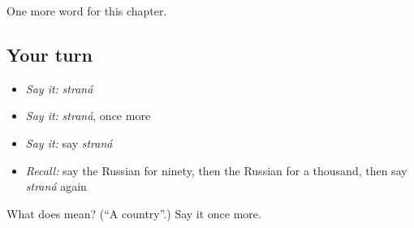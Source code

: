\begin{grammarlens}[title={What you've built}]
One more word for this chapter.
\end{grammarlens}

\subsection*{Your turn}
\begin{itemize}
\raggedright
  \item \emph{Say it:} \emph{straná}
  \item \emph{Say it:} \emph{straná}, once more
  \item \emph{Say it:} say \emph{straná}
  \item \emph{Recall:} say the Russian for ninety, then the Russian for a thousand, then say \emph{straná} again
\end{itemize}

\begin{tcolorbox}[breakable,colback=teal!4,colframe=teal!35!black,title={Before you move on}]
What does  mean? (\textquotedblleft{}A country\textquotedblright{}.) Say it once more.
\end{tcolorbox}
